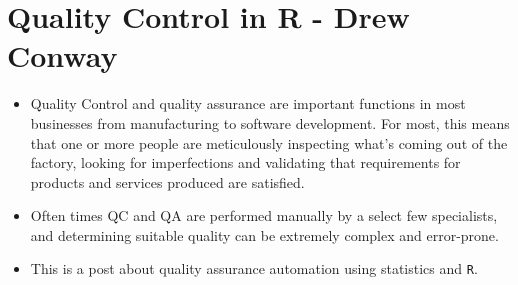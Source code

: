 \documentclass[a4paper,12pt]{article}
\begin{document}
\tableofcontents

\newpage
\section{Quality Control in R - Drew Conway}

\begin{itemize}
\item Quality Control and quality assurance are important functions in most businesses from manufacturing to software development. For most, this means that one or more people are meticulously inspecting what's coming out of the factory, looking for imperfections and validating that requirements for products and services produced are satisfied. 

\item Often times QC and QA are performed manually by a select few specialists, and determining suitable quality can be extremely complex and error-prone.
\item 
This is a post about quality assurance automation using statistics and \texttt{R}.
\end{itemize}
\newpage
\end{document}
